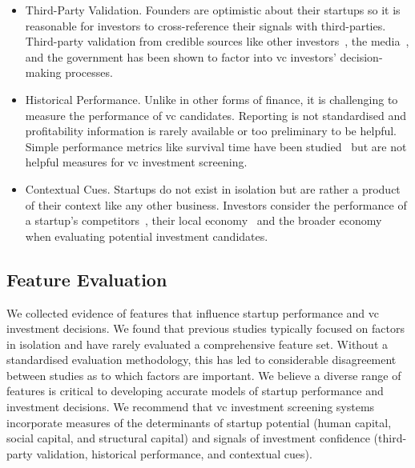 \documentclass[../thesis/thesis.tex]{subfiles}
\begin{document}
\begin{itemize}

\item Third-Party Validation. Founders are optimistic about their startups so it is reasonable for investors to cross-reference their signals with third-parties. Third-party validation from credible sources like other investors~\cite{ahlers2015,beckwith2016,croce2016,hoenen2014,conti2013}, the media~\cite{beckwith2016}, and the government has been shown to factor into \gls{vc} investors' decision-making processes.

\item Historical Performance. Unlike in other forms of finance, it is challenging to measure the performance of \gls{vc} candidates. Reporting is not standardised and profitability information is rarely available or too preliminary to be helpful. Simple performance metrics like survival time have been studied~\cite{an2015,gimmon2010} but are not helpful measures for \gls{vc} investment screening.

\item Contextual Cues. Startups do not exist in isolation but are rather a product of their context like any other business. Investors consider the performance of a startup's competitors~\cite{shan2014,croce2016,gimmon2010}, their local economy~\cite{beckwith2016,croce2016,gimmon2010} and the broader economy~\cite{croce2016,hoenen2014} when evaluating potential investment candidates.

\end{itemize}

\subsection{Feature Evaluation}

We collected evidence of features that influence startup performance and \gls{vc} investment decisions. We found that previous studies typically focused on factors in isolation and have rarely evaluated a comprehensive feature set. Without a standardised evaluation methodology, this has led to considerable disagreement between studies as to which factors are important. We believe a diverse range of features is critical to developing accurate models of startup performance and investment decisions. We recommend that \gls{vc} investment screening systems incorporate measures of the determinants of startup potential (human capital, social capital, and structural capital) and signals of investment confidence (third-party validation, historical performance, and contextual cues).
\end{document}
